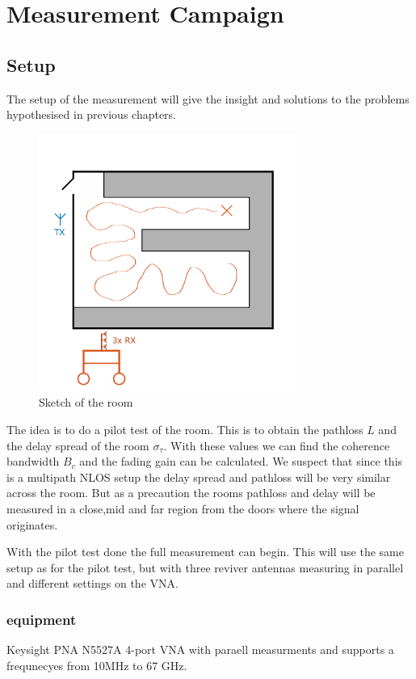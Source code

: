 \chapter{Measurement Campaign}
\section{Setup}
The setup of the measurement will give the insight and solutions to the problems hypothesised in previous chapters. 

\begin{figure}[H]
\centering
\includegraphics[width=0.75\textwidth]{figures/Gimp_figures/MeasSetup.png}
\caption{Sketch of the room}
\label{room sketch}
\end{figure}

The idea is to do a pilot test of the room. This is to obtain the pathloss $L$ and the delay spread of the room $\sigma_\tau$. With these values we can find the coherence bandwidth $B_c$ and the fading gain can be calculated. 
We suspect that since this is a multipath NLOS setup the delay spread and pathloss will be very similar across the room. But as a precaution the rooms pathloss and delay will be measured in a close,mid and far region from the doors where the signal originates.

With the pilot test done the full measurement can begin. This will use the same setup as for the pilot test, but with three reviver antennas measuring in parallel and different settings on the VNA. 



\subsection{equipment}
\label{equip}
Keysight PNA N5527A 4-port VNA with paraell measurments and supports a frequnecyes from 10MHz to 67 GHz.

